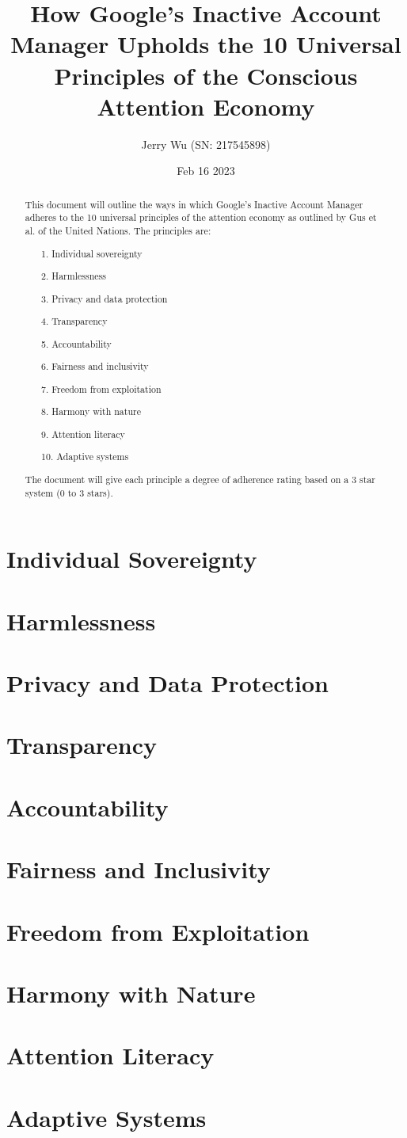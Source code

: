 \documentclass[12pt]{article}
\title{How Google's Inactive Account Manager Upholds the 10 Universal Principles of the Conscious Attention Economy}
\author{Jerry Wu (SN: 217545898)}
\date{Feb 16 2023}
\begin{document}
\maketitle
\tableofcontents

\begin{abstract}
    This document will outline the ways in which Google's Inactive Account Manager adheres to the 10 universal principles of the attention economy as outlined by Gus et al. of the United Nations. The principles are:

    \begin{itemize}
        \item[1.] Individual sovereignty
        \item[2.] Harmlessness
        \item[3.] Privacy and data protection
        \item[4.] Transparency
        \item[5.] Accountability
        \item[6.] Fairness and inclusivity
        \item[7.] Freedom from exploitation
        \item[8.] Harmony with nature
        \item[9.] Attention literacy
        \item[10.] Adaptive systems
    \end{itemize}

    The document will give each principle a degree of adherence rating based on a 3 star system (0 to 3 stars).

\end{abstract}

\section{Individual Sovereignty}
\section{Harmlessness}
\section{Privacy and Data Protection}
\section{Transparency}
\section{Accountability}
\section{Fairness and Inclusivity}
\section{Freedom from Exploitation}
\section{Harmony with Nature}
\section{Attention Literacy}
\section{Adaptive Systems}
\end{document}
